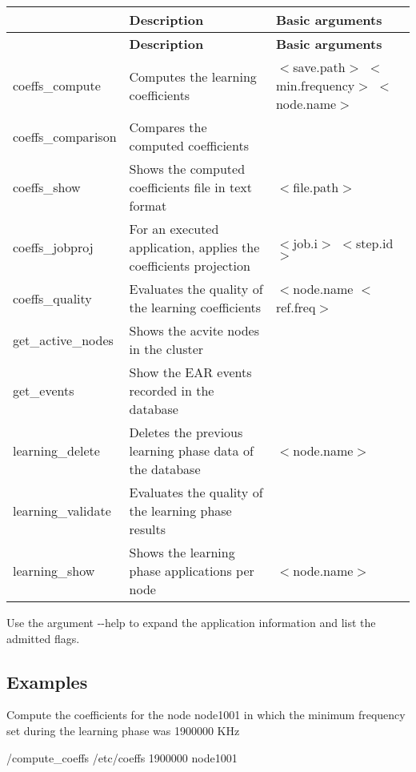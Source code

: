 \tabulinesep=1mm
\begin{longtabu} spread 0pt [c]{*3{|X[-1]}|}
\hline
{}&{\bf Description }&{\bf Basic arguments  }\\
\endfirsthead
\hline
\endfoot
\hline
{}&{\bf Description }&{\bf Basic arguments  }\\
\endhead
coeffs\+\_\+compute &Computes the learning coefficients &$<$save.\+path$>$ $<$min.\+frequency$>$ $<$node.\+name$>$ \\
coeffs\+\_\+comparison &Compares the computed coefficients &\\
coeffs\+\_\+show &Shows the computed coefficients file in text format &$<$file.\+path$>$ \\
coeffs\+\_\+jobproj &For an executed application, applies the coefficients projection &$<$job.\+i$>$ $<$step.\+id$>$ \\
coeffs\+\_\+quality &Evaluates the quality of the learning coefficients &$<$node.\+name $<$ref.\+freq$>$ \\
get\+\_\+active\+\_\+nodes &Shows the acvite nodes in the cluster &\\
get\+\_\+events &Show the E\+AR events recorded in the database &\\
learning\+\_\+delete &Deletes the previous learning phase data of the database &$<$node.\+name$>$ \\
learning\+\_\+validate &Evaluates the quality of the learning phase results &\\
learning\+\_\+show &Shows the learning phase applications per node &$<$node.\+name$>$ \\
\end{longtabu}

\begin{DoxyItemize}
\item Use the argument {\ttfamily -\/-\/help} to expand the application information and list the admitted flags.
\end{DoxyItemize}

\subsection*{Examples }


\begin{DoxyItemize}
\item Compute the coefficients for the node {\ttfamily node1001} in which the minimum frequency set during the learning phase was 1900000 K\+Hz
\end{DoxyItemize}

{\ttfamily /compute\+\_\+coeffs /etc/coeffs 1900000 node1001} 